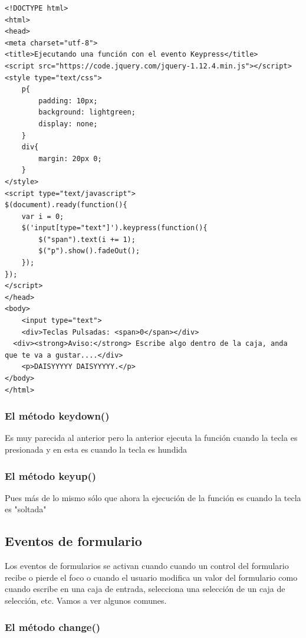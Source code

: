\documentclass[11pt]{article}
\begin{document}
\begin{verbatim}
<!DOCTYPE html>
<html>
<head>
<meta charset="utf-8">
<title>Ejecutando una función con el evento Keypress</title>
<script src="https://code.jquery.com/jquery-1.12.4.min.js"></script>
<style type="text/css">
    p{
        padding: 10px;
        background: lightgreen;
        display: none;
    }
    div{
        margin: 20px 0;
    }
</style>
<script type="text/javascript">
$(document).ready(function(){
    var i = 0;
    $('input[type="text"]').keypress(function(){
        $("span").text(i += 1);
        $("p").show().fadeOut();
    });
});
</script>
</head>
<body>
    <input type="text">
    <div>Teclas Pulsadas: <span>0</span></div>
  <div><strong>Aviso:</strong> Escribe algo dentro de la caja, anda que te va a gustar....</div>
    <p>DAISYYYYY DAISYYYYY.</p>
</body>
</html>                                		
\end{verbatim}


\subsubsection*{El método keydown()}
\label{sec:orgf4a7741}

Es muy parecida al anterior pero la anterior ejecuta la función cuando la tecla es presionada y en esta es cuando la tecla es hundida

\subsubsection*{El método keyup()}
\label{sec:org1f82b65}

Pues más de lo mismo sólo que ahora la ejecución de la función es cuando la tecla es "soltada"


\subsection*{Eventos de formulario}
\label{sec:org3d74d29}

Los eventos de formularios se activan cuando cuando un control del formulario recibe o pierde el foco o cuando el usuario modifica un valor del formulario como cuando escribe en una caja de entrada, selecciona una selección de un caja de selección, etc. Vamos a ver algunos comunes.

\subsubsection*{El método change()}
\label{sec:orgcb615e3}
\end{document}
